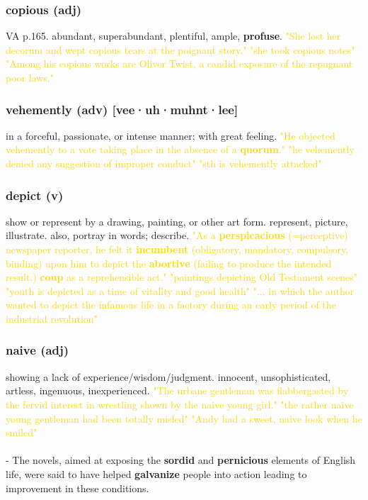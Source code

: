 \documentclass{proc}
\begin{document}
	\subsubsection{\textcolor{brickred}{copious} (adj)}
	VA p.165. 
	abundant,
	superabundant,
	plentiful,
	ample,
	\textbf{profuse}.
	\textcolor{gold}{"She lost her decorum and wept copious tears at the poignant story." "she took copious notes" "Among his copious works are 
		Oliver Twist, a candid exposure of the repugnant poor laws."}
	
	\subsubsection{\textcolor{brickred}{vehemently} (adv) [vee·uh·muhnt·lee]}
	in a forceful, passionate, or intense manner; with great feeling.
	\textcolor{gold}{"He objected vehemently to a vote taking place in the absence of a \textbf{quorum}." "he vehemently denied any suggestion of improper conduct" "sth is vehemently attacked"}
	
	\subsubsection{\textcolor{brickred}{depict} (v)}
	show or represent by a drawing, painting, or other art form. represent,
	picture,
	illustrate. also, portray in words; describe.
	\textcolor{gold}{"As a \textbf{perspicacious} (=perceptive) newspaper reporter, he felt it \textbf{incumbent} (obligatory,
		mandatory, compulsory, binding) upon him to
		depict the \textbf{abortive} (failing to produce the intended result.) \textbf{coup} as a reprehensible act." "paintings depicting Old Testament scenes" "youth is depicted as a time of vitality and good health" "... in which the 
		author wanted to depict the infamous life in a factory during 
		an early period of the industrial revolution"}
	
	\subsubsection{\textcolor{brickred}{naive} (adj)}
	showing a lack of experience/wisdom/judgment.
	innocent,
	unsophisticated,
	artless,
	ingenuous,
	inexperienced.
	\textcolor{gold}{"The urbane gentleman was flabbergasted by the fervid interest in wrestling shown
		by the naive young girl." "the rather naive young gentleman had been totally misled" "Andy had a sweet, naive look when he smiled"}\\\\
	- The novels, aimed at exposing the \textbf{sordid} 
	and \textbf{pernicious} elements of English life, were said to have 
	helped \textbf{galvanize} people into action leading to improvement 
	in these conditions. 
	
\end{document}
